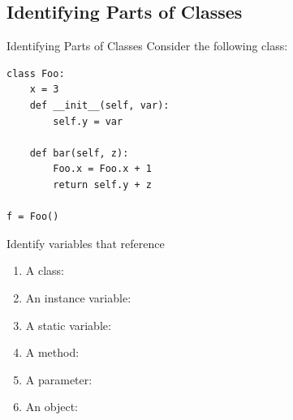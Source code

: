 \documentclass[9pt]{beamer}
\begin{document}
\subsection{Identifying Parts of Classes}
\begin{frame}[fragile]{Identifying Parts of Classes}
  Consider the following class:

  \begin{lstlisting}
class Foo:
    x = 3
    def __init__(self, var):
        self.y = var

    def bar(self, z):
        Foo.x = Foo.x + 1
        return self.y + z

f = Foo()
  \end{lstlisting}

  Identify variables that reference
  \begin{enumerate}
    \item
      A class: 
    \item
      An instance variable: 
    \item
      A static variable: 
    \item
      A method: 
    \item
      A parameter: 
    \item
      An object: 
  \end{enumerate}

\end{frame}
\end{document}
